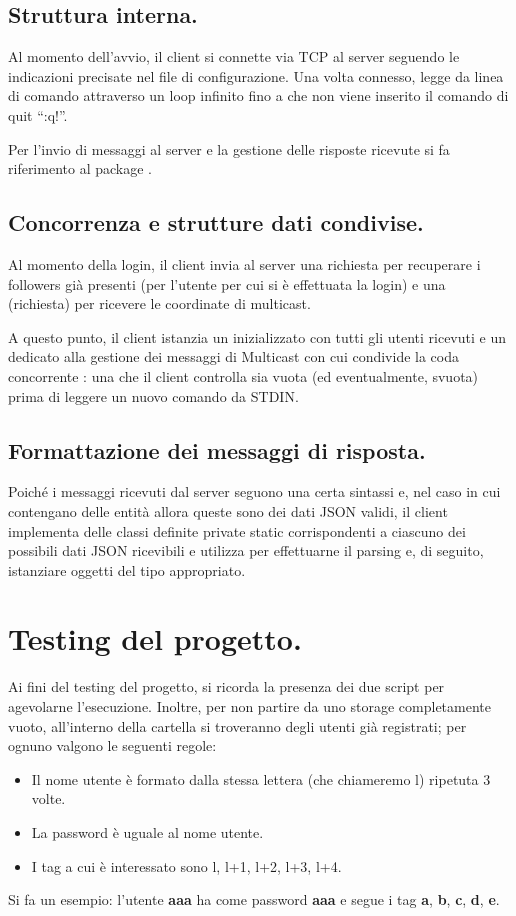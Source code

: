 \documentclass[11pt, italian, openany]{book}
\begin{document}
\begin{sloppypar}
\subsection*{Struttura interna.}
Al momento dell'avvio, il client si connette via TCP al server seguendo le indicazioni precisate nel file di configurazione.
Una volta connesso, legge da linea di comando attraverso un loop infinito fino a che non viene inserito il comando di quit ``:q!''.

Per l'invio di messaggi al server e la gestione delle risposte ricevute si fa riferimento al package .

\subsection*{Concorrenza e strutture dati condivise.}
Al momento della login, il client invia al server una richiesta per recuperare i followers gi\`a presenti (per l'utente per cui si \`e
effettuata la login) e una (richiesta) per ricevere le coordinate di multicast.

A questo punto, il client istanzia un  inizializzato con tutti gli utenti ricevuti e un
 dedicato alla gestione dei messaggi di Multicast con cui condivide la coda concorrente :
una  che il client controlla sia vuota (ed eventualmente, svuota) prima di leggere un nuovo comando da STDIN.

\subsection*{Formattazione dei messaggi di risposta.}
Poich\'e i messaggi ricevuti dal server seguono una certa sintassi e, nel caso in cui contengano delle entit\`a allora queste sono dei
dati JSON validi, il client implementa delle classi definite private static corrispondenti a ciascuno dei possibili dati JSON
ricevibili e utilizza  per effettuarne il parsing e, di seguito, istanziare oggetti del tipo appropriato.

\section{Testing del progetto.}
Ai fini del testing del progetto, si ricorda la presenza dei due script per agevolarne l'esecuzione. Inoltre, per non partire da uno
storage completamente vuoto, all'interno della cartella  si troveranno degli utenti gi\`a registrati; per ognuno valgono le
seguenti regole:
\begin{itemize}[topsep=0pt, itemsep=0pt, parsep=0pt]
	\item Il nome utente \`e formato dalla stessa lettera (che chiameremo l) ripetuta 3 volte.
	\item La password \`e uguale al nome utente.
	\item I tag a cui \`e interessato sono l, l+1, l+2, l+3, l+4.
\end{itemize}
Si fa un esempio: l'utente \textbf{aaa} ha come password \textbf{aaa} e segue i tag \textbf{a}, \textbf{b}, \textbf{c}, \textbf{d},
\textbf{e}. 

\end{sloppypar}
\end{document}
